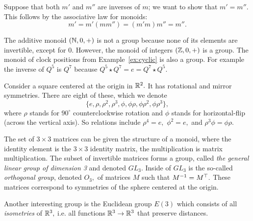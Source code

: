 \documentclass[../main/CT4S-EN-RU]{subfiles}
\begin{document}
\begin{propositionRUS}
\end{propositionRUS}

\begin{proofENG}
Suppose that both $m'$ and $m''$ are inverses of $m$; we want to show that $m'=m''.$ This follows by the associative law for monoids:
$$m'=m'(mm'')=(m'm)m''=m''.$$
\end{proofENG}

\begin{proofRUS}
\end{proofRUS}

\begin{exampleENG}
The additive monoid $({\mathbb N},0,+)$ is not a group because none of its elements are invertible, except for $0.$ However, the monoid of integers $({\mathbb Z},0,+)$ is a group. The monoid of clock positions from Example~\ref{ex:cyclic} is also a group. For example the inverse of $Q^5$ is $Q^7$ because $Q^5\star Q^7=e=Q^7\star Q^5.$
\end{exampleENG}

\begin{exampleRUS}
\end{exampleRUS}

\begin{exampleENG}
Consider a square centered at the origin in ${\mathbb R}^2.$ It has rotational and mirror symmetries. There are eight of these, which we denote $$\{e,\rho,\rho^2,\rho^3,\phi,\phi\rho,\phi\rho^2,\phi\rho^3\},$$ where $\rho$ stands for $90^\circ$ counterclockwise rotation and $\phi$ stands for horizontal-flip (across the vertical axis). So relations include $\rho^4=e,$ $\phi^2=e,$ and $\rho^3\phi=\phi\rho.$
\end{exampleENG}

\begin{exampleRUS}
\end{exampleRUS}

\begin{exampleENG}\label{ex:important groups}
The set of $3\times 3$ matrices can be given the structure of a monoid, where the identity element is the $3\times 3$ identity matrix, the multiplication is matrix multiplication. The subset of invertible matrices forms a group, called {\em the general linear group of dimension 3} and denoted $GL_3.$ Inside of $GL_3$ is the so-called {\em orthogonal group}, denoted $O_3,$ of matrices $M$ such that $M^\m1=M^\top.$ These matrices correspond to symmetries of the sphere centered at the origin.

Another interesting group is the Euclidean group $E(3)$ which consists of all {\em isometries} of ${\mathbb R}^3,$ i.e. all functions ${\mathbb R}^3\rightarrow{\mathbb R}^3$ that preserve distances.  
\end{exampleENG}
\end{document}
